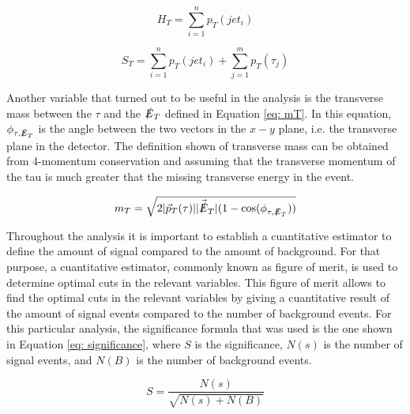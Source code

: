 \begin{equation}
 H_{T} = \sum_{i=1}^{n} p_{T}(jet_{i})
 \label{eq: HT}
\end{equation}

\begin{equation}
 S_{T} = \sum_{i=1}^{n} p_{T}(jet_{i}) + \sum_{j=1}^{m} p_{T}(\tau_{j})
 \label{eq: ST}
\end{equation}

Another variable that turned out to be useful in the analysis is the transverse mass between the $\tau$ and the $\slashed{E}_{T}$ defined in Equation \ref{eq: mT}. In this equation, $\phi_{\tau, \slashed{E}_{T}}$ is the angle between the two vectors in the $x-y$ plane, i.e. the transverse plane in the detector. The definition shown of transverse mass can be obtained from 4-momentum conservation and assuming that the transverse momentum of the tau is much greater that the missing transverse energy in the event. 

\begin{equation}\label{eq: mT}
m_{T} = \sqrt{2 |\vec{p}_{T}(\tau)|| \vec{\slashed{E}}_{T}| (1 - \cos(\phi_{\tau, \slashed{E}_{T} }))}
\end{equation}

Throughout the analysis it is important to establish a cuantitative estimator to define the amount of signal compared to the amount of background. For that purpose, a cuantitative estimator, commonly known as figure of merit, is used to determine optimal cuts in the relevant variables. This figure of merit allows to find the optimal cuts in the relevant variables by giving a cuantitative result of the amount of signal events compared to the number of background events. For this particular analysis, the significance formula that was used is the one shown in Equation \ref{eq: significance}, where $S$ is the significance, $N(s)$ is the number of signal events, and $N(B)$ is the number of background events.

\begin{equation} \label{eq: significance}
    S = \frac{N(s)}{\sqrt{N(s) + N(B)}}
\end{equation}






 



